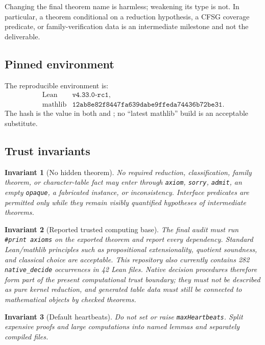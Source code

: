 \documentclass[11pt]{article}
\newtheorem{invariant}{Invariant}
\begin{document}
Changing the final theorem name is harmless; weakening its type is not.
In particular, a theorem conditional on a reduction hypothesis, a CFSG
coverage predicate, or family-verification data is an intermediate
milestone and not the deliverable.

\subsection{Pinned environment}

The reproducible environment is:
\[
\begin{array}{ll}
\text{Lean} & \texttt{v4.33.0-rc1},\\
\text{mathlib} &
\texttt{12ab8e82f8447fa639dabe9ffeda74436b72be31}.
\end{array}
\]
The hash is the value in both  and
; no ``latest mathlib'' build is an acceptable
substitute.

\subsection{Trust invariants}

\begin{invariant}[No hidden theorem]
No required reduction, classification, family theorem, or character-table
fact may enter through \texttt{axiom}, \texttt{sorry}, \texttt{admit}, an
empty \texttt{opaque}, a fabricated instance, or inconsistency.  Interface
predicates are permitted only while they remain visibly quantified
hypotheses of intermediate theorems.
\end{invariant}

\begin{invariant}[Reported trusted computing base]
The final audit must run \texttt{\#print axioms} on the exported theorem and
report every dependency.  Standard Lean/mathlib principles such as
propositional extensionality, quotient soundness, and classical choice are
acceptable.  This repository also currently contains 282
\texttt{native\_decide} occurrences in 42 Lean files.  Native decision
procedures therefore form part of the present computational trust boundary;
they must not be described as pure kernel reduction, and generated table
data must still be connected to mathematical objects by checked theorems.
\end{invariant}

\begin{invariant}[Default heartbeats]
Do not set or raise \texttt{maxHeartbeats}.  Split expensive proofs and
large computations into named lemmas and separately compiled files.
\end{invariant}
\end{document}

